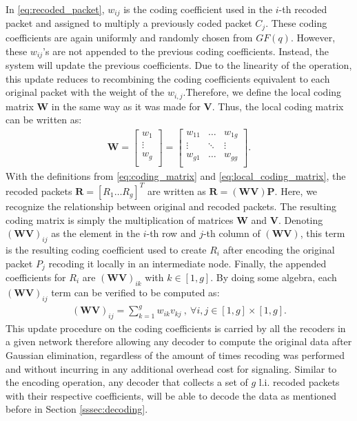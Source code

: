 In \eqref{eq:recoded_packet}, $w_{ij}$ is the coding coefficient used
in the $i$-th recoded packet and assigned to multiply a previously
coded packet $C_j$. These coding coefficients are again uniformly and
randomly chosen from $GF(q)$. However, these $w_{ij}$'s are not
appended to the previous coding coefficients.  Instead, the system
will update the previous coefficients. Due to the linearity of the
operation, this update reduces to recombining the coding coefficients
equivalent to each original packet with the weight of the
$w_{i,j}$.Therefore, we define the local coding matrix $\textbf{W}$ in
the same way as it was made for $\textbf{V}$. Thus, the local coding
matrix can be written as:
%
\begin{align} \label{eq:local_coding_matrix}
\textbf{W} =
\left[
\begin{array}{c}
        w_1    \\ \hline
        \vdots \\ \hline
        w_g    \\
\end{array}
\right]
=
\left[
\begin{array}{ccc}
        w_{11} & \ldots & w_{1g} \\
        \vdots  & \ddots & \vdots  \\
        w_{g1} & \ldots & w_{gg} \\
\end{array}
\right].
\end{align}
%
With the definitions from \eqref{eq:coding_matrix} and
\eqref{eq:local_coding_matrix}, the recoded packets
$\textbf{R} = \left[R_1 \ldots R_g \right]^T$ are written as
$\textbf{R} = (\textbf{W} \textbf{V}) \textbf{P}$. Here, we recognize
the relationship between original and recoded packets. The resulting
coding matrix is simply the multiplication of matrices $\textbf{W}$ and
$\textbf{V}$. Denoting ${(\textbf{W} \textbf{V})}_{ij}$ as the element
in the $i$-th row and $j$-th column of $(\textbf{W} \textbf{V})$, this
term is the resulting coding coefficient used to create $R_i$ after
encoding the original packet $P_j$ recoding it locally in an intermediate
node. Finally, the appended coefficients for $R_i$ are
${(\textbf{W} \textbf{V})}_{ik}$ with $k \in [1,g]$. By doing some
algebra, each ${(\textbf{W} \textbf{V})}_{ij}$ term can be verified to be
computed as:
%
\begin{align}
\label{eq:appended_coded_coefficients}
{(\textbf{W} \textbf{V})}_{ij} = \sum_{k=1}^{g} w_{ik} v_{kj}\ ,\ \forall i,j \in [1,g] \times [1,g].
\end{align}
%
This update procedure on the coding coefficients is carried by all the
recoders in a given network therefore allowing any decoder to compute
the original data after Gaussian elimination, regardless of the amount
of times recoding was performed and without incurring in any
additional overhead cost for signaling. Similar to the encoding
operation, any decoder that collects a set of $g$ \ac{l.i.} recoded
packets with their respective coefficients, will be able to decode the
data as mentioned before in Section \ref{sssec:decoding}.

